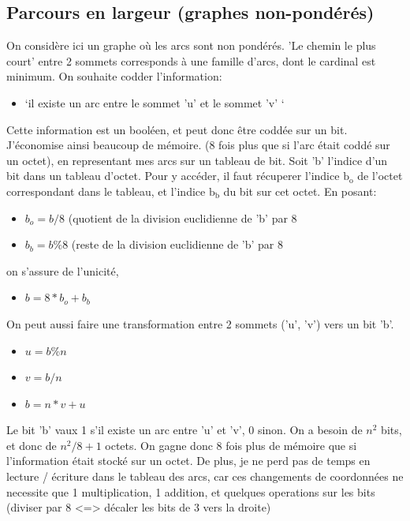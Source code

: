 \documentclass[10pt]{article}
\begin{document}
		\subsection{Parcours en largeur (graphes non-pondérés)}
			On considère ici un graphe où les arcs sont non pondérés. 'Le chemin le plus court'
			entre 2 sommets corresponds à une famille d'arcs, dont le cardinal est minimum.
			On souhaite codder l'information:
			\begin{itemize}[label=-]
				\item `il existe un arc entre le sommet 'u' et le sommet 'v' `
			\end{itemize}
			Cette information est un booléen, et peut donc être coddée sur un bit.
			J'économise ainsi beaucoup de mémoire. (8 fois plus que si l'arc était coddé sur un octet),
			en representant mes arcs sur un tableau de bit. Soit 'b' l'indice d'un bit dans un tableau d'octet.
			Pour y accéder, il faut récuperer l'indice $\textrm{b}_\textrm{o}$ de l'octet correspondant dans le tableau,
			et l'indice $\textrm{b}_\textrm{b}$ du bit sur cet octet.\newline
			En posant:
			\begin{itemize}[label=-]
				\item \(b_o = b / 8\) (quotient de la division euclidienne de 'b' par 8
				\item \(b_b = b \% 8\) (reste de la division euclidienne de 'b' par 8
			\end{itemize}
			on s'assure de l'unicité,
			\begin{itemize}[label=-]
				\item \(b = 8*b_o+b_b\)
			\end{itemize}
			On peut aussi faire une transformation entre 2 sommets ('u', 'v') vers un bit 'b'.

			\begin{itemize}[label=-]
				\item \(u = b \% n\)
				\item \(v = b / n\)
				\item \(b = n * v + u\)
			\end{itemize}
			
			Le bit 'b' vaux 1 s'il existe un arc entre 'u' et 'v', 0 sinon.
			On a besoin de \(n^2\) bits, et donc de \(n^2 / 8 + 1\) octets.
			On gagne donc 8 fois plus de mémoire que si l'information était stocké sur un octet.
			De plus, je ne perd pas de temps en lecture / écriture dans le tableau des arcs, car ces changements
			de coordonnées ne necessite que 1 multiplication, 1 addition, et quelques operations sur les bits (diviser par 8 <=> décaler
			les bits de 3 vers la droite)
			
\end{document}
